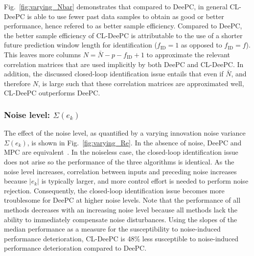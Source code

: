 Fig.~\ref{fig:varying_Nbar} demonstrates that compared to \ac{DeePC}, in general \ac{CL-DeePC} is able to use fewer past data samples to obtain as good or better performance, hence refered to as better sample efficiency. Compared to \ac{DeePC}, the better sample efficiency of \ac{CL-DeePC} is attributable to the use of a shorter future prediction window length for identification ($f_\mathrm{ID}=1$ as opposed to $f_\mathrm{ID}=f$). This leaves more columns $N=\bar{N}-p-f_\mathrm{ID}+1$ to approximate the relevant correlation matrices that are used implicitly by both \ac{DeePC} and \ac{CL-DeePC}. In addition, the discussed closed-loop identification issue entails that even if $\bar{N}$, and therefore $N$, is large such that these correlation matrices are approximated well, \ac{CL-DeePC} outperforms \ac{DeePC}.

\subsubsection{Noise level: $\Sigma(e_k)$}
\noindent The effect of the noise level, as quantified by a varying innovation noise variance $\Sigma(e_k)$, is shown in Fig.~\ref{fig:varying_Re}. In the absence of noise, \ac{DeePC} and \ac{MPC} are equivalent~\citep{Coulson2019}. In the noiseless case, the closed-loop identification issue does not arise so the performance of the three algorithms is identical. As the noise level increases, correlation between inputs and preceding noise increases because $|e_k|$ is typically larger, and more control effort is needed to perform noise rejection. Consequently, the closed-loop identification issue becomes more troublesome for \ac{DeePC} at higher noise levels. Note that the performance of all methods decreases with an increasing noise level because all methods lack the ability to immediately compensate noise disturbances. Using the slopes of the median performance as a measure for the susceptibility to noise-induced performance deterioration, \ac{CL-DeePC} is 48\% less susceptible to noise-induced performance deterioration compared to \ac{DeePC}.%
